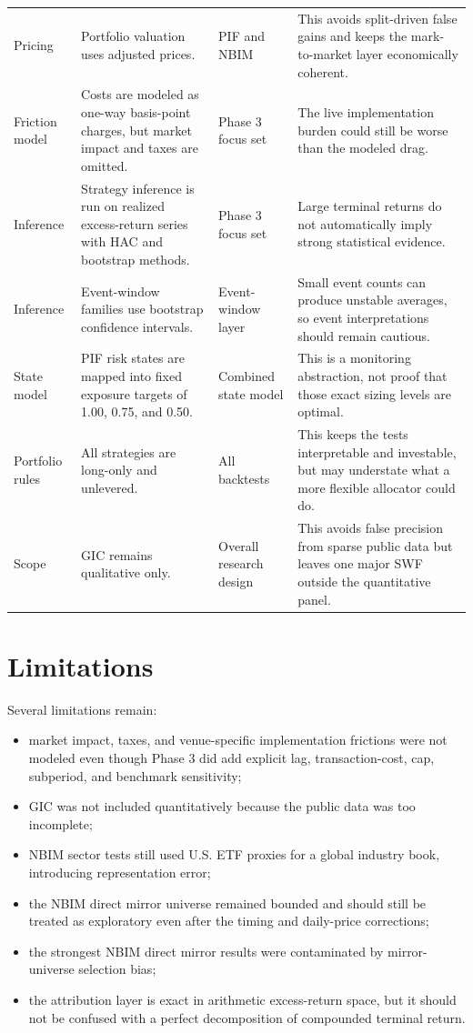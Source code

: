 \documentclass[conference]{IEEEtran}
\begin{document}
\begin{table}[!t]
{\begin{tabular}{p{2.0cm} p{5.6cm} p{2.5cm} p{5.6cm}}
Pricing & Portfolio valuation uses adjusted prices. & PIF and NBIM & This avoids split-driven false gains and keeps the mark-to-market layer economically coherent. \\
Friction model & Costs are modeled as one-way basis-point charges, but market impact and taxes are omitted. & Phase 3 focus set & The live implementation burden could still be worse than the modeled drag. \\
Inference & Strategy inference is run on realized excess-return series with HAC and bootstrap methods. & Phase 3 focus set & Large terminal returns do not automatically imply strong statistical evidence. \\
Inference & Event-window families use bootstrap confidence intervals. & Event-window layer & Small event counts can produce unstable averages, so event interpretations should remain cautious. \\
State model & PIF risk states are mapped into fixed exposure targets of 1.00, 0.75, and 0.50. & Combined state model & This is a monitoring abstraction, not proof that those exact sizing levels are optimal. \\
Portfolio rules & All strategies are long-only and unlevered. & All backtests & This keeps the tests interpretable and investable, but may understate what a more flexible allocator could do. \\
Scope & GIC remains qualitative only. & Overall research design & This avoids false precision from sparse public data but leaves one major SWF outside the quantitative panel. \\
\bottomrule
\end{tabular}
}
\end{table}

\section{Limitations}

Several limitations remain:
\begin{itemize}[leftmargin=1.4em]
    \item market impact, taxes, and venue-specific implementation frictions were not modeled even though Phase 3 did add explicit lag, transaction-cost, cap, subperiod, and benchmark sensitivity;
    \item GIC was not included quantitatively because the public data was too incomplete;
    \item NBIM sector tests still used U.S. ETF proxies for a global industry book, introducing representation error;
    \item the NBIM direct mirror universe remained bounded and should still be treated as exploratory even after the timing and daily-price corrections;
    \item the strongest NBIM direct mirror results were contaminated by mirror-universe selection bias;
    \item the attribution layer is exact in arithmetic excess-return space, but it should not be confused with a perfect decomposition of compounded terminal return.
\end{itemize}
\end{document}
